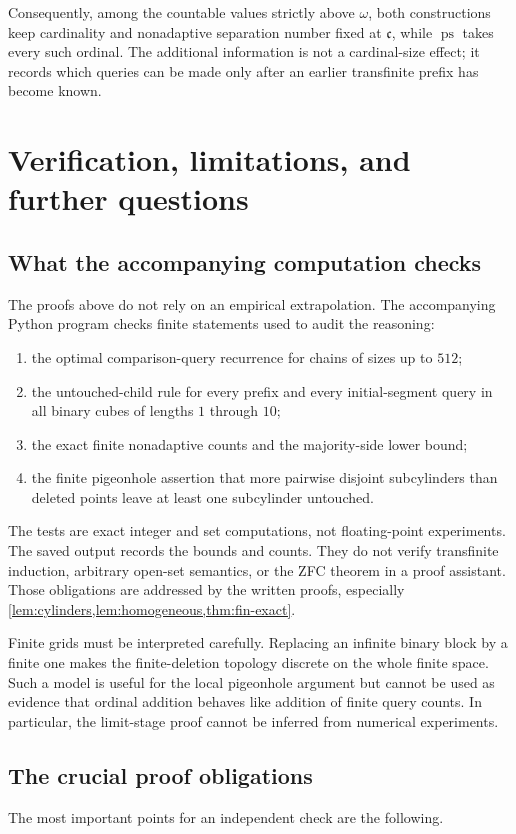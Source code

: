 \documentclass[11pt,a4paper]{article}
\theoremstyle{definition}
\theoremstyle{remark}
\newcommand{\ps}{\operatorname{ps}}
\newcommand{\cfr}{\mathfrak c}
\begin{document}
Consequently, among the countable values strictly above $\omega$, both
constructions keep cardinality and nonadaptive separation number fixed at
$\cfr$, while $\ps$ takes every such ordinal. The additional information is
not a cardinal-size effect; it records which queries can be made only after an
earlier transfinite prefix has become known.

\section{Verification, limitations, and further questions}

\subsection{What the accompanying computation checks}
The proofs above do not rely on an empirical extrapolation. The accompanying
Python program checks finite statements used to audit the reasoning:
\begin{enumerate}[label=(\alph*)]
\item the optimal comparison-query recurrence for chains of sizes up to $512$;
\item the untouched-child rule for every prefix and every initial-segment query
in all binary cubes of lengths $1$ through $10$;
\item the exact finite nonadaptive counts and the majority-side lower bound;
\item the finite pigeonhole assertion that more pairwise disjoint subcylinders
than deleted points leave at least one subcylinder untouched.
\end{enumerate}
The tests are exact integer and set computations, not floating-point experiments.
The saved output records the bounds and counts. They do not verify transfinite
induction, arbitrary open-set semantics, or the ZFC theorem in a proof assistant.
Those obligations are addressed by the written proofs, especially
\cref{lem:cylinders,lem:homogeneous,thm:fin-exact}.

Finite grids must be interpreted carefully. Replacing an infinite binary block
by a finite one makes the finite-deletion topology discrete on the whole finite
space. Such a model is useful for the local pigeonhole argument but cannot be
used as evidence that ordinal addition behaves like addition of finite query
counts. In particular, the limit-stage proof cannot be inferred from numerical
experiments.

\subsection{The crucial proof obligations}
The most important points for an independent check are the following.
\end{document}
